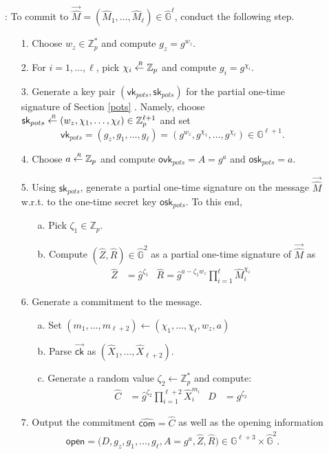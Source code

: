 \documentclass[10pt]{llncs}
\newcommand{\G}{\mathbb{G}}
\newcommand{\Z}{\mathbb{Z}}
\newcommand{\sk}{\mathsf{sk}}
\newcommand{\ck}{\mathsf{ck}}
\newcommand{\vk}{\mathsf{vk}}
\newcommand{\ovk}{\mathsf{ovk}}
\newcommand{\osk}{\mathsf{osk}}
\newcommand{\com}{\hat{\mathsf{com}}}
\newcommand{\open}{\mathsf{open}}
\newcommand{\sample}{\stackrel{{\scriptscriptstyle \mkern4mu R}}{\gets}}
\newcommand{\wrt}{\textrm{w.r.t.} }
\newcommand{\Com}{{\mathsf{Commit}}}
\newcommand{\PPP}{\mathsf{PP}}
\begin{document}
\begin{description}
\item[\boldmath{$TC.\Com(\PPP, \ck, \vec{M})$}]: To commit to  $\vec{\hat{M}} = (\hat{M}_1, \dots, \hat{M}_\ell) \in \hat{\G}^\ell$, conduct the 
following step. \smallskip  \smallskip 
  \begin{enumerate}
  \item[1.] Choose  $w_z \in \mathbb{Z}_p^*$ and compute $g_z = g^{w_z}$.
  \item[2.] For $i = 1, \dots, \ell$, pick $\chi_i \sample \mathbb{Z}_p$ and compute $g_i = g^{\chi_i}$.
  \item[3.] Generate a key pair $(\vk_{pots},\sk_{pots})$ for the partial one-time signature of Section \ref{pots} . Namely, choose 
	$\sk_{pots} \sample (w_z,\chi_1, \dots, \chi_\ell) \in \Z_p^{\ell+1}$ and set 
 	$$\vk_{pots} = (g_z, g_1, \dots, g_\ell) =( g^{w_z},g^{\chi_1},\ldots, g^{\chi_{\ell}} ) \in \G^{\ell+1}.$$
  \item[4.] Choose  $a \sample \mathbb{Z}_p$ and compute $\ovk_{pots} =A = g^{a}$ and $\osk_{pots} = a$.
  \item[5.] Using $\sk_{pots}$,  generate a partial one-time signature  on the message $\vec{\hat{M}}$ \wrt to the one-time  secret key $\osk_{pots}$.
	 To this end, \smallskip 
	    \begin{enumerate}
    \item[a.] Pick $\zeta_1 \in \mathbb{Z}_p$.
    \item[b.] Compute  $(\hat{Z}, \hat{R}) \in \hat{\G}^2$ as a partial one-time signature of $\vec{\hat{M}}$ as
      \begin{align*}
	\hat{Z} &= \hat{g}^{\zeta_1} & \hat{R} = \hat{g}^{a-\zeta_1 w_z}\prod_{i=1}^{\ell} \hat{M}_i^{\chi_i} 
      \end{align*}
    \end{enumerate}
  \item[6.] Generate a commitment to the message.
    \begin{enumerate}
    \item[a.] Set $(m_1, \dots, m_{\ell+2}) \gets (\chi_1, \dots, \chi_\ell, w_z, a)$ 
    \item[b.] Parse $\vec{\ck}$ as $(\hat{X}_1, \dots, \hat{X}_{\ell+2})$.
    \item[c.] Generate a random value $\zeta_2 \gets \mathbb{Z}_p^*$ and compute:
      \begin{align*}
	\hat{C} &= \hat{g}^{\zeta_2}\prod_{i = 1}^{\ell+2}\hat{X}_i^{m_i} & D &= g^{\zeta_2}
      \end{align*}
    \end{enumerate}
  \item[7.] Output the commitment  $\com  = \hat{C}$ as well as the opening information
	\begin{eqnarray} \label{open}
	\open = \big( D, g_z, g_1, \dots, g_\ell, A = g^a, \hat{Z}, \hat{R} \big) \in \G^{\ell+3} \times \hat{\G}^{2}.   
	\end{eqnarray}
	\smallskip 
  \end{enumerate}
  

\end{description}
\end{document}
